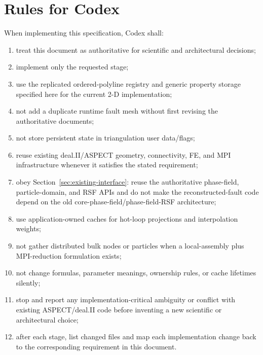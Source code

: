 \documentclass[11pt]{article}
\begin{document}
\section{Rules for Codex}

When implementing this specification, Codex shall:
\begin{enumerate}
  \item treat this document as authoritative for scientific and architectural decisions;
  \item implement only the requested stage;
  \item use the replicated ordered-polyline registry and generic property
        storage specified here for the current 2-D implementation;
  \item not add a duplicate runtime fault mesh without first revising the
        authoritative documents;
  \item not store persistent state in triangulation user data/flags;
  \item reuse existing deal.II/ASPECT geometry, connectivity, FE, and MPI infrastructure whenever it satisfies the stated requirement;
  \item obey Section~\ref{sec:existing-interface}: reuse the authoritative phase-field, particle-domain, and RSF APIs and do not make the reconstructed-fault code depend on the old core-phase-field/phase-field-RSF architecture;
  \item use application-owned caches for hot-loop projections and interpolation weights;
  \item not gather distributed bulk nodes or particles when a local-assembly plus MPI-reduction formulation exists;
  \item not change formulas, parameter meanings, ownership rules, or cache lifetimes silently;
  \item stop and report any implementation-critical ambiguity or conflict with existing ASPECT/deal.II code before inventing a new scientific or architectural choice;
  \item after each stage, list changed files and map each implementation change back to the corresponding requirement in this document.
\end{enumerate}
\end{document}
